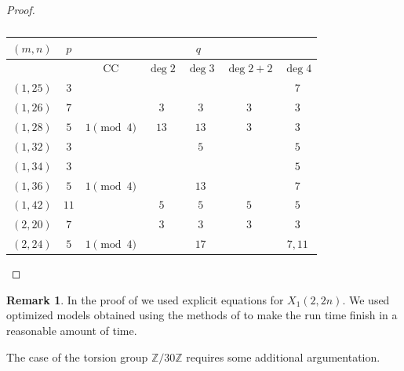 \documentclass[11pt,reqno]{amsart}
\theoremstyle{definition}
\newtheorem{remark}[theorem]{Remark}
\numberwithin{equation}{section}
\def\torz#1{\mathbb Z /#1 \mathbb Z}
\begin{document}
\begin{proof}
\begin{table}[H]
\centering
\begin{tabular}{|c|c|c|c|c|c|c|}
\hline
$(m,n)$ & $p$ & \multicolumn{5}{|c|}{$q$} \\
\hline
& &  CC & $\deg2$ &   $\deg 3$ & $\deg 2+2$ & $\deg 4$  \\
\hline
$(1,25)$ & $3$ &    &    &   &   & $7$ \\
\hline
$(1,26)$ & $7$ & & $3$ &  $3$ &  $3$     & $3$ \\
\hline
$(1,28)$ & $5$ & $ 1 \pmod 4$ & $13$  & $13$ &  $3$ &   $3$ \\
\hline
$(1,32)$ & $3$ & &  &    $5$  &  & $5$ \\
\hline
$(1,34)$ & $3$ &  &   &   &    & $5$ \\
\hline
$(1,36)$ & $5$ &  $ 1 \pmod 4$ &   &$13$ & & $7$ \\
\hline
$(1,42)$ & $11$ & & $5$ & $5$ & $5$ &     $5$ \\
\hline
$(2,20)$ & $7$ & & $3$  & $3$  &  $3$    & $3$ \\
\hline
$(2,24)$ & $5$ & $ 1 \pmod 4$ &   &     $17$ & &  $7,11$ \\
\hline


\end{tabular}
\caption{}\label{table:Hecke_sieve}
\end{table}
\end{proof}

\begin{remark}
    In the proof of  we used explicit equations for $X_1(2,2n)$. We used optimized models obtained using the methods of \cite[\S 3]{sutherlandtorsion} to make the run time finish in a reasonable amount of time.
\end{remark}


The case of the torsion group $\torz{30}$ requires some additional argumentation. 
\end{document}
